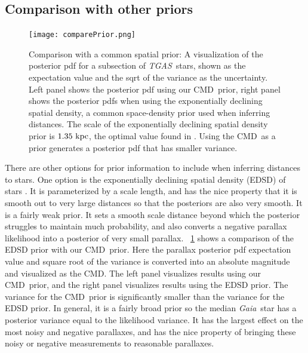 \documentclass[modern]{aastex61}
\newcommand{\acronym}[1]{{\small{#1}}}
\newcommand{\project}[1]{\textsl{#1}}
\newcommand{\tgas}{\project{\acronym{TGAS}}}
\newcommand{\gaia}{\project{Gaia}}
\newcommand{\cmd}{\acronym{CMD}}
\begin{document}
\subsection{Comparison with other priors}
\begin{figure}
\centering
  \texttt{[image: comparePrior.png]}
\caption{Comparison with a common spatial prior: A visualization of the posterior pdf for a subsection of \tgas\ stars, shown as the expectation value and the sqrt of the variance as the uncertainty. Left panel shows the posterior pdf using our \cmd\ prior, right panel shows the posterior pdfs when using the exponentially declining spatial density, a common space-density prior used when inferring distances. The scale of the exponentially declining spatial density prior is $1.35~{\rm kpc}$, the optimal value found in \cite{astraatmadja16a}. Using the \cmd\ as a prior generates a posterior pdf that has smaller variance.}
\label{fig:comparePrior}
\end{figure}

There are other options for prior information to include when inferring distances to stars.
One option is the exponentially declining spatial density (EDSD) of stars \citep{astraatmadja16a}.
It is parameterized by a scale length, and has the nice property that it is smooth out to very large distances so that the posteriors are also very smooth.
It is a fairly weak prior.
It sets a smooth scale distance beyond which the posterior struggles to maintain much probability, and also converts a negative parallax likelihood into a posterior of very small parallax.
\figurename~\ref{fig:comparePrior} shows a comparison of the EDSD prior with our \cmd\ prior.
Here the parallax posterior pdf expectation value and square root of the variance is converted into an absolute magnitude and visualized as the \cmd.
The left panel visualizes results using our \cmd\ prior, and the right panel visualizes results using the EDSD prior.
The variance for the \cmd\ prior is significantly smaller than the variance for the EDSD prior.
In general, it is a fairly broad prior so the median \gaia\ star has a posterior variance equal to the likelihood variance.
It has the largest effect on the most noisy and negative parallaxes, and has the nice property of bringing these noisy or negative measurements to reasonable parallaxes.
\end{document}
